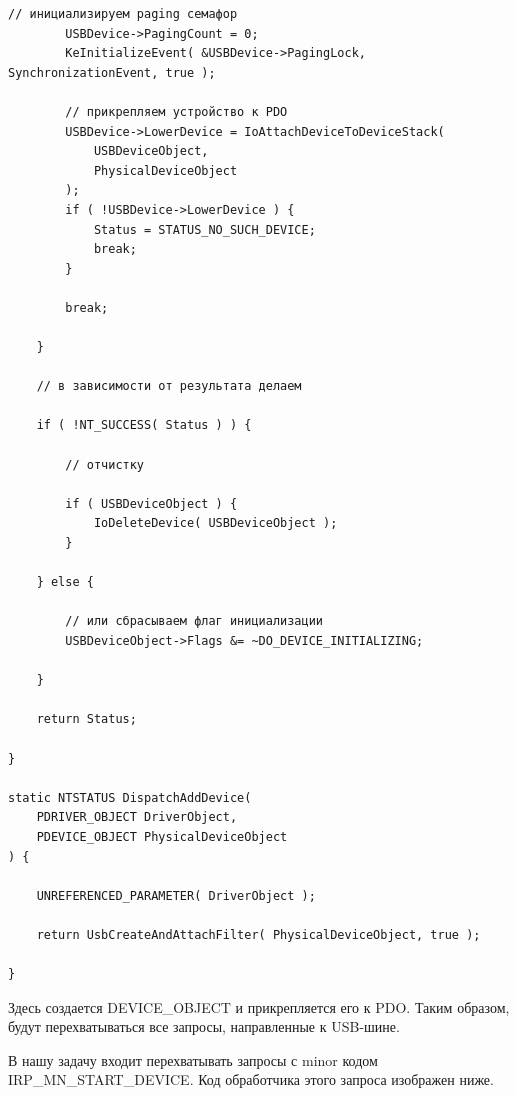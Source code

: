 \documentclass[14pt,a4paper]{article}
\begin{document}
\begin{lstlisting}[language=c caption={AddDevice обработчик}]
		// инициализируем paging семафор
		USBDevice->PagingCount = 0;
		KeInitializeEvent( &USBDevice->PagingLock, SynchronizationEvent, true );

		// прикрепляем устройство к PDO
		USBDevice->LowerDevice = IoAttachDeviceToDeviceStack( 
			USBDeviceObject, 
			PhysicalDeviceObject 
		);
		if ( !USBDevice->LowerDevice ) {
			Status = STATUS_NO_SUCH_DEVICE;
			break;
		}

		break;

	}

	// в зависимости от результата делаем

	if ( !NT_SUCCESS( Status ) ) {

		// отчистку

		if ( USBDeviceObject ) {
			IoDeleteDevice( USBDeviceObject );
		}

	} else {

		// или сбрасываем флаг инициализации
		USBDeviceObject->Flags &= ~DO_DEVICE_INITIALIZING;

	}

	return Status;

}

static NTSTATUS DispatchAddDevice( 
	PDRIVER_OBJECT DriverObject, 
	PDEVICE_OBJECT PhysicalDeviceObject 
) {

	UNREFERENCED_PARAMETER( DriverObject );

	return UsbCreateAndAttachFilter( PhysicalDeviceObject, true );

}
\end{lstlisting}

Здесь создается DEVICE\_OBJECT и прикрепляется его к PDO. Таким образом, будут перехватываться все запросы, направленные к USB-шине. \\

\par В нашу задачу входит перехватывать запросы с minor кодом IRP\_MN\_START\_DEVICE. Код обработчика этого запроса изображен ниже.
\end{document}

